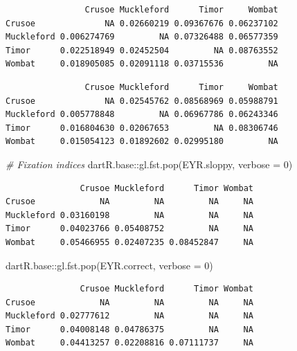 \documentclass[
  letterpaper,
  DIV=11,
  numbers=noendperiod]{scrreprt}
\newenvironment{Shaded}{\begin{snugshade}}{\end{snugshade}}
\newcommand{\AttributeTok}[1]{\textcolor[rgb]{0.49,0.56,0.16}{#1}}
\newcommand{\CommentTok}[1]{\textcolor[rgb]{0.38,0.63,0.69}{\textit{#1}}}
\newcommand{\DecValTok}[1]{\textcolor[rgb]{0.25,0.63,0.44}{#1}}
\newcommand{\FunctionTok}[1]{\textcolor[rgb]{0.02,0.16,0.49}{#1}}
\newcommand{\NormalTok}[1]{\textcolor[rgb]{0.00,0.44,0.13}{#1}}
\newcommand{\SpecialCharTok}[1]{\textcolor[rgb]{0.25,0.44,0.63}{#1}}
\begin{document}
\begin{verbatim}
                Crusoe Muckleford      Timor     Wombat
Crusoe              NA 0.02660219 0.09367676 0.06237102
Muckleford 0.006274769         NA 0.07326488 0.06577359
Timor      0.022518949 0.02452504         NA 0.08763552
Wombat     0.018905085 0.02091118 0.03715536         NA
\end{verbatim}

\begin{Shaded}
\end{Shaded}

\begin{verbatim}
                Crusoe Muckleford      Timor     Wombat
Crusoe              NA 0.02545762 0.08568969 0.05988791
Muckleford 0.005778848         NA 0.06967786 0.06243346
Timor      0.016804630 0.02067653         NA 0.08306746
Wombat     0.015054123 0.01892602 0.02995180         NA
\end{verbatim}

\begin{Shaded}
\begin{Highlighting}[]
\CommentTok{\# Fixation indices}
\NormalTok{dartR.base}\SpecialCharTok{::}\FunctionTok{gl.fst.pop}\NormalTok{(EYR.sloppy, }\AttributeTok{verbose =} \DecValTok{0}\NormalTok{)}
\end{Highlighting}
\end{Shaded}

\begin{verbatim}
               Crusoe Muckleford      Timor Wombat
Crusoe             NA         NA         NA     NA
Muckleford 0.03160198         NA         NA     NA
Timor      0.04023766 0.05408752         NA     NA
Wombat     0.05466955 0.02407235 0.08452847     NA
\end{verbatim}

\begin{Shaded}
\begin{Highlighting}[]
\NormalTok{dartR.base}\SpecialCharTok{::}\FunctionTok{gl.fst.pop}\NormalTok{(EYR.correct, }\AttributeTok{verbose =} \DecValTok{0}\NormalTok{)}
\end{Highlighting}
\end{Shaded}

\begin{verbatim}
               Crusoe Muckleford      Timor Wombat
Crusoe             NA         NA         NA     NA
Muckleford 0.02777612         NA         NA     NA
Timor      0.04008148 0.04786375         NA     NA
Wombat     0.04413257 0.02208816 0.07111737     NA
\end{verbatim}
\end{document}

